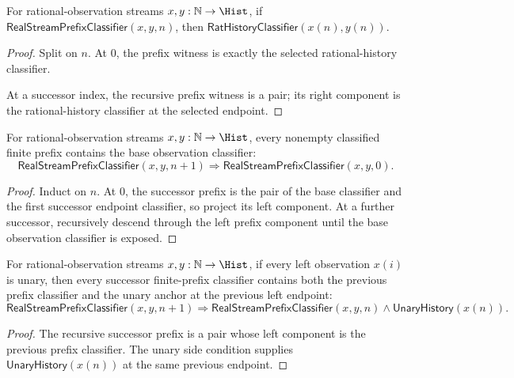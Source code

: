 \begin{theorem}
\label{thm:real-stream-prefix-classifier-endpoint}
For rational-observation streams $x,y:\mathbb{N}\to\Hist$, if
$\mathsf{RealStreamPrefixClassifier}(x,y,n)$, then
$\mathsf{RatHistoryClassifier}(x(n),y(n))$.
\end{theorem}
\begin{proof}
Split on $n$. At $0$, the prefix witness is exactly the selected rational-history
classifier.

At a successor index, the recursive prefix witness is a pair; its right
component is the rational-history classifier at the selected endpoint.
\end{proof}

\begin{theorem}
\label{thm:real-stream-prefix-classifier-base-of-successor}
For rational-observation streams $x,y:\mathbb{N}\to\Hist$, every nonempty
classified finite prefix contains the base observation classifier:
$$
\mathsf{RealStreamPrefixClassifier}(x,y,n+1)
\Longrightarrow
\mathsf{RealStreamPrefixClassifier}(x,y,0).
$$
\end{theorem}
\begin{proof}
Induct on $n$. At $0$, the successor prefix is the pair of the base classifier
and the first successor endpoint classifier, so project its left component. At
a further successor, recursively descend through the left prefix component until
the base observation classifier is exposed.
\end{proof}

\begin{lemma}
\label{lem:real-stream-prefix-previous-with-unary}
For rational-observation streams $x,y:\mathbb{N}\to\Hist$, if every left observation $x(i)$ is unary, then every successor finite-prefix classifier contains both the previous prefix classifier and the unary anchor at the previous left endpoint:
$$
\mathsf{RealStreamPrefixClassifier}(x,y,n+1)
\Longrightarrow
\mathsf{RealStreamPrefixClassifier}(x,y,n)\wedge \mathsf{UnaryHistory}(x(n)).
$$
\end{lemma}
\begin{proof}
The recursive successor prefix is a pair whose left component is the previous prefix classifier. The unary side condition supplies $\mathsf{UnaryHistory}(x(n))$ at the same previous endpoint.
\end{proof}

